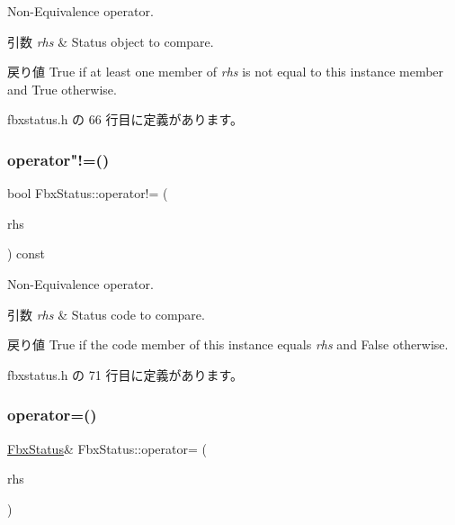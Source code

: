 Non-\/\+Equivalence operator. 
\begin{DoxyParams}{引数}
{\em rhs} & Status object to compare. \\
\hline
\end{DoxyParams}
\begin{DoxyReturn}{戻り値}
{\ttfamily True} if at least one member of {\itshape rhs} is not equal to this instance member and {\ttfamily True} otherwise. 
\end{DoxyReturn}


 fbxstatus.\+h の 66 行目に定義があります。

\mbox{\label{class_fbx_status_a1f05b05e754a2a8f763f567b0b458010}} 
\subsubsection{\texorpdfstring{operator"!=()}{operator!=()}\hspace{0.1cm}{\footnotesize\ttfamily [2/2]}}
{\footnotesize\ttfamily bool Fbx\+Status\+::operator!= (\begin{DoxyParamCaption}\item[{const \hyperlink{class_fbx_status_a6a631d5d95b28e31a19aabd5f5809ecc}{E\+Status\+Code}}]{rhs }\end{DoxyParamCaption}) const\hspace{0.3cm}{\ttfamily [inline]}}

Non-\/\+Equivalence operator. 
\begin{DoxyParams}{引数}
{\em rhs} & Status code to compare. \\
\hline
\end{DoxyParams}
\begin{DoxyReturn}{戻り値}
{\ttfamily True} if the code member of this instance equals {\itshape rhs} and {\ttfamily False} otherwise. 
\end{DoxyReturn}


 fbxstatus.\+h の 71 行目に定義があります。

\mbox{\label{class_fbx_status_a014bcc7b3ccd713f98f87d9eac77b579}} 
\subsubsection{\texorpdfstring{operator=()}{operator=()}}
{\footnotesize\ttfamily \hyperlink{class_fbx_status}{Fbx\+Status}\& Fbx\+Status\+::operator= (\begin{DoxyParamCaption}\item[{const \hyperlink{class_fbx_status}{Fbx\+Status} \&}]{rhs }\end{DoxyParamCaption})}


